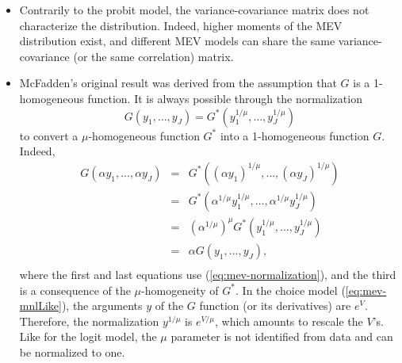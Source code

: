 \documentclass[12pt,a4paper]{article}
\newcommand{\req}[1]{(\ref{#1})}
\begin{document}
\begin{itemize}
\item Contrarily to the probit model, the variance-covariance
matrix does not characterize the distribution. Indeed, higher moments
of the MEV distribution exist, and different MEV models can share the
same variance-covariance (or the same correlation) matrix.
\item McFadden's original result was derived from the assumption that
  $G$ is a 1-homogeneous function. It is always possible through the normalization 
\begin{equation}
\label{eq:mev-normalization}
G(y_1,\ldots,y_{J})=G^*(y_1^{1/\mu},\ldots,y_{J}^{1/\mu})
\end{equation}
to convert a $\mu$-homogeneous function $G^*$ into a 1-homogeneous function $G$.
Indeed,
\[
\begin{array}{rcl}
G(\alpha y_1,\ldots,\alpha y_{J}) &=& G^*((\alpha y_1)^{1/\mu},\ldots,(\alpha y_{J})^{1/\mu})  \\
 &=& G^*(\alpha^{1/\mu} y_1^{1/\mu},\ldots,\alpha^{1/\mu} y_{J}^{1/\mu})   \\
 &=& (\alpha^{1/\mu})^\mu G^*(y_1^{1/\mu},\ldots,y_{J}^{1/\mu})  \\
 &=& \alpha G(y_1,\ldots,y_{J}), \\
\end{array}
\]
where the first and last equations use \req{eq:mev-normalization}, and the third is a consequence of the $\mu$-homogeneity of $G^*$.
In the choice model \req{eq:mev-mnlLike}, the arguments $y$ of the $G$ function (or its derivatives) are $e^V$. Therefore, the normalization $y^{1/\mu}$ is $e^{V/\mu}$, which amounts to rescale the $V$'s. 
 Like for the logit model, the $\mu$ parameter is not identified from
 data and can be normalized to one.


\end{itemize}
\end{document}
